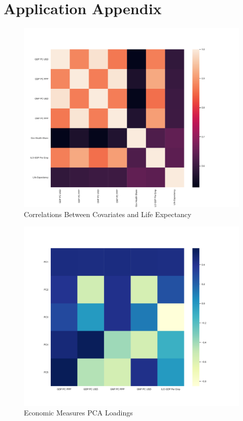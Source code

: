 \documentclass[10pt]{article}
\begin{document}
\clearpage

    \section*{Application Appendix}

        \begin{figure}[H]
            \centering
            \caption{Correlations Between Covariates and Life Expectancy}
            \label{LE_Health_Econ_Correlations}	
            \includegraphics[width=\linewidth,keepaspectratio=true]{../Output/Figures/LE_Health_Econ_Correlations_wb_only_short.pdf}
        \end{figure}

        \begin{figure}[H]
            \centering
            \caption{Economic Measures PCA Loadings}
            \label{Econ_Loadings}	
            \includegraphics[width=\linewidth,keepaspectratio=true]{../Output/Figures/Econ_Indicator_Loadings_wb_only_short.pdf}
        \end{figure}
\end{document}
